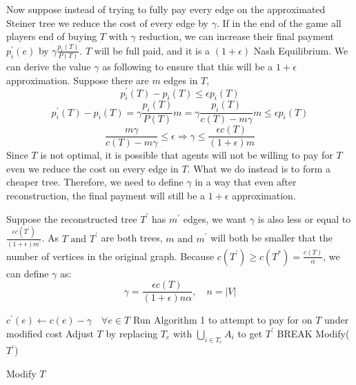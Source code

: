 \documentclass[11pt,psfig,times]{article}
\begin{document}
	Now suppose instead of trying to fully pay every edge on the approximated Steiner tree we reduce the cost of every edge by $\gamma$. If in the end of the game all players end of buying  $T$ with $\gamma$ reduction, we can increase their final payment $p_i^{'}(e)$ by $\gamma\frac{p_i(T)}{P(T)}$. $T$ will be full paid, and it is a $(1+\epsilon)$ Nash Equilibrium. We can derive the value $\gamma$ as following to ensure that this will be a $1+ \epsilon$ approximation. Suppose there are $m$ edges in $T$,
	\[p_i^{'}(T) - p_i(T) \leq \epsilon p_i(T)\]
	\[p_i^{'}(T) - p_i(T) =  \gamma\frac{p_i(T)}{P(T)}m =  \gamma\frac{p_i(T)}{c(T)-m\gamma}m \leq \epsilon p_i(T)\]
	\[ \frac{m\gamma}{c(T)-m\gamma} \leq \epsilon \Rightarrow \gamma \leq \frac{\epsilon c(T)}{(1+\epsilon)m}\]
	Since $T$ is not optimal, it is possible that agents will not be willing to pay for $T$ even we reduce the cost on every edge in $T$. What we do instead is to form a cheaper tree. Therefore, we need to define $\gamma$ in a way that even after reconstruction, the final payment will still be a $1+\epsilon$ approximation. 
	
	Suppose the reconstructed tree $T^{'}$ has $m^{'}$ edges, we want $\gamma$ is also less or equal to $\frac{\epsilon c(T^{'})}{(1+\epsilon)m^{'}}$. As $T \text{ and } T^{'}$ are both trees, $m \text{ and } m^{'}$ will both be smaller that the number of vertices in the original graph.  Because $c(T^{'}) \geq c(T^*) = \frac{c(T)}{\alpha}$, we can define $\gamma$ as:
	\[\gamma = \frac{\epsilon c(T)}{(1+\epsilon)n\alpha},\quad n = |V|\]
	
	
		\begin{algorithm}[H]
			\begin{algorithmic}[2]
				\STATE $c^{'}(e) \gets  c(e) -\gamma \quad \forall e \in T$
				\STATE Run Algorithm 1 to attempt to pay for on $T$ under modified cost
				\STATE  Adjust \( T\) by replacing \(T_e\) with  \(\bigcup_{i\in T_e} A_i\) to get \(T^{'}\)
				\STATE BREAK
				\ENDIF
				\ENDWHILE
				\STATE Modify($T^{'}$)
			   
			\end{algorithmic}
			\caption{Modify $T$ }
			\end{algorithm}
		
	
\end{document}
